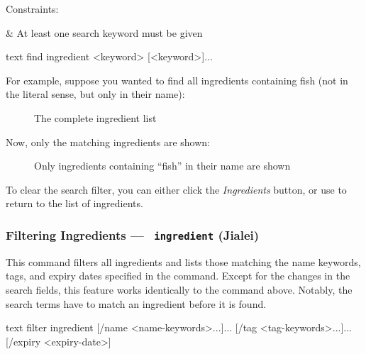 	Constraints:
	\begin{romanlist}
		& At least one search keyword must be given
	\end{romanlist}

	 \begin{blockofcode}{text}
		find ingredient
			<keyword>
			[<keyword>]...
	\end{blockofcode}

	For example, suppose you wanted to find all ingredients containing fish (not in the literal sense, but only in their name):

	\begin{figure}[!htbp]\centering\ContinuedFloat*
		\caption{The complete ingredient list}
	\end{figure}

	\pagebreak
	Now, only the matching ingredients are shown:

	\begin{figure}[!htbp]\centering\ContinuedFloat
		\caption{Only ingredients containing \enquote{fish} in their name are shown}
	\end{figure}

	To clear the search filter, you can either click the \emph{Ingredients} button, or use  to return
	to the list of ingredients.






\hypertarget{FilterIngredientCommand}{}
\subsubsection{Filtering Ingredients — \texttt{ ingredient} (Jialei)}

	This command filters all ingredients and lists those matching the name keywords, tags, and expiry dates specified in the command.
	Except for the changes in the search fields, this feature works identically to the
	\hyperlink{FilterRecipeCommand}{} command above. Notably,  the search terms have to match an
	ingredient before it is found.

	 \begin{blockofcode}{text}
		filter ingredient
			[/name <name-keywords>...]...
			[/tag <tag-keywords>...]...
			[/expiry <expiry-date>]
	\end{blockofcode}

